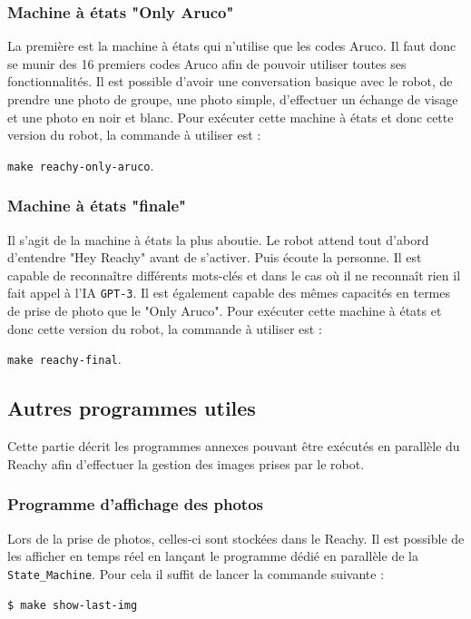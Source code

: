 \documentclass[a4paper,french]{article}
\begin{document}
\subsubsection{Machine à états "Only Aruco"}
La première est la machine à états qui n'utilise que les codes Aruco. Il faut donc se munir des 16 premiers codes Aruco afin de pouvoir utiliser toutes ses fonctionnalités. Il est possible d'avoir une conversation basique avec le robot, de prendre une photo de groupe, une photo simple, d'effectuer un échange de visage et une photo en noir et blanc. Pour exécuter cette machine à états et donc cette version du robot, la commande à utiliser est : 
\begin{center}
    \texttt{make reachy-only-aruco}.
\end{center}

\subsubsection{Machine à états "finale"}
Il s'agit de la machine à états la plus aboutie. Le robot attend tout d'abord d'entendre "Hey Reachy" avant de s'activer. Puis écoute la personne. Il est capable de reconnaître différents mots-clés et dans le cas où il ne reconnaît rien il fait appel à l'IA \texttt{GPT-3}. Il est également capable des mêmes capacités en termes de prise de photo que le "Only Aruco". Pour exécuter cette machine à états et donc cette version du robot, la commande à utiliser est : 
\begin{center}
    \texttt{make reachy-final}.
\end{center}


\subsection{Autres programmes utiles}

Cette partie décrit les programmes annexes pouvant être exécutés en parallèle du Reachy afin d'effectuer la gestion des images prises par le robot.

\subsubsection{Programme d'affichage des photos}
Lors de la prise de photos, celles-ci sont stockées dans le Reachy. Il est possible de les afficher en temps réel en lançant le programme dédié en parallèle de la \texttt{State\_Machine}. Pour cela il suffit de lancer la commande suivante : 
\begin{center}
    \texttt{\$ make show-last-img}
\end{center}
\end{document}
